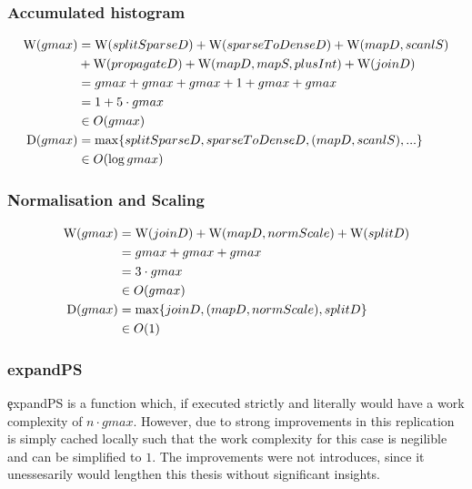     \subsubsection{Accumulated histogram}
      \begin{equation}
      \begin{split}
      \textrm{W}(gmax)
            & = \textrm{W}(splitSparseD) + \textrm{W}(sparseToDenseD) + \textrm{W}(mapD,scanlS) \\
            &     + \textrm{W}(propagateD) + \textrm{W}(mapD,mapS,plusInt) + \textrm{W}(joinD) \\
            & = gmax + gmax + gmax + 1 + gmax + gmax\\
            & = 1 + 5 \cdot gmax \\
            & \in O(gmax) \\
      \textrm{D}(gmax)
          & = \max \{ splitSparseD, sparseToDenseD, (mapD,scanlS),...\} \\
          & \in O(\log gmax)
      \end{split}
      \end{equation}
    
    \subsubsection{Normalisation and Scaling}
      \begin{equation}
      \begin{split}
      \textrm{W}(gmax)
            & = \textrm{W}(joinD) + \textrm{W}(mapD,normScale) + \textrm{W}(splitD) \\
            & = gmax + gmax + gmax \\
            & = 3 \cdot gmax \\
            & \in O(gmax) \\
      \textrm{D}(gmax)
          & = \max \{ joinD,(mapD,normScale),splitD\} \\
          & \in O(1)
      \end{split}
      \end{equation}
      
    \subsubsection{expandPS}
      \c{expandPS} is a function which, if executed strictly
      and literally would have a work complexity of $n \cdot gmax$.
      However, due to strong improvements in \cite{EffiVect2012Lipp}
      this replication is simply cached locally such that
      the work complexity for this case is negilible and
      can be simplified to $1$. The improvements were not
      introduces, since it unessesarily would lengthen this
      thesis without significant insights.
      

